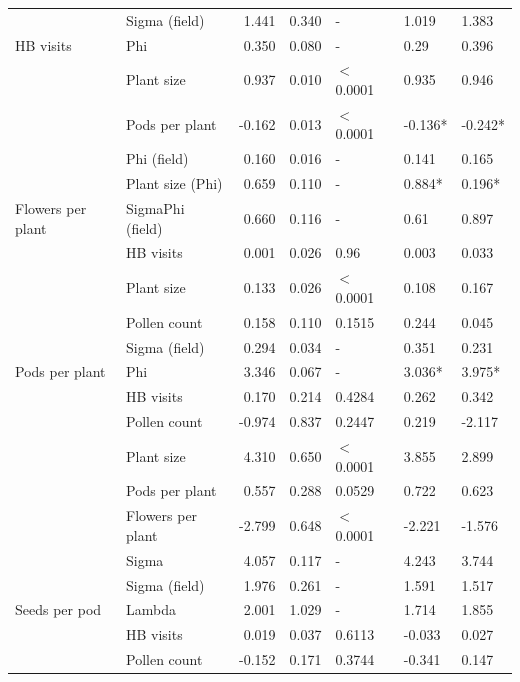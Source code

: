 \documentclass[12pt]{article} %
\begin{document}
\begin{longtable}{l|l|r|r|l|l|l}
\cline{2-7}
 & Sigma (field) & 1.441 & 0.340 & - & 1.019 & 1.383\\
\cline{2-7}
\multirow{-5}{*}{\raggedright\arraybackslash HB visits} & Phi & 0.350 & 0.080 & - & 0.29 & 0.396\\
\cline{1-7}
 & Plant size & 0.937 & 0.010 & $<$0.0001 & 0.935 & 0.946\\
\cline{2-7}
 & Pods per plant & -0.162 & 0.013 & $<$0.0001 & -0.136* & -0.242*\\
\cline{2-7}
 & Phi (field) & 0.160 & 0.016 & - & 0.141 & 0.165\\
\cline{2-7}
 & Plant size (Phi) & 0.659 & 0.110 & - & 0.884* & 0.196*\\
\cline{2-7}
\multirow{-5}{*}{\raggedright\arraybackslash Flowers per plant} & SigmaPhi (field) & 0.660 & 0.116 & - & 0.61 & 0.897\\
\cline{1-7}
 & HB visits & 0.001 & 0.026 & 0.96 & 0.003 & 0.033\\
\cline{2-7}
 & Plant size & 0.133 & 0.026 & $<$0.0001 & 0.108 & 0.167\\
\cline{2-7}
 & Pollen count & 0.158 & 0.110 & 0.1515 & 0.244 & 0.045\\
\cline{2-7}
 & Sigma (field) & 0.294 & 0.034 & - & 0.351 & 0.231\\
\cline{2-7}
\multirow{-5}{*}{\raggedright\arraybackslash Pods per plant} & Phi & 3.346 & 0.067 & - & 3.036* & 3.975*\\
\cline{1-7}
 & HB visits & 0.170 & 0.214 & 0.4284 & 0.262 & 0.342\\
\cline{2-7}
 & Pollen count & -0.974 & 0.837 & 0.2447 & 0.219 & -2.117\\
\cline{2-7}
 & Plant size & 4.310 & 0.650 & $<$0.0001 & 3.855 & 2.899\\
\cline{2-7}
 & Pods per plant & 0.557 & 0.288 & 0.0529 & 0.722 & 0.623\\
\cline{2-7}
 & Flowers per plant & -2.799 & 0.648 & $<$0.0001 & -2.221 & -1.576\\
\cline{2-7}
 & Sigma & 4.057 & 0.117 & - & 4.243 & 3.744\\
\cline{2-7}
 & Sigma (field) & 1.976 & 0.261 & - & 1.591 & 1.517\\
\cline{2-7}
\multirow{-8}{*}{\raggedright\arraybackslash Seeds per pod} & Lambda & 2.001 & 1.029 & - & 1.714 & 1.855\\
\cline{1-7}
 & HB visits & 0.019 & 0.037 & 0.6113 & -0.033 & 0.027\\
\cline{2-7}
 & Pollen count & -0.152 & 0.171 & 0.3744 & -0.341 & 0.147\\

\end{longtable}
\end{document}
